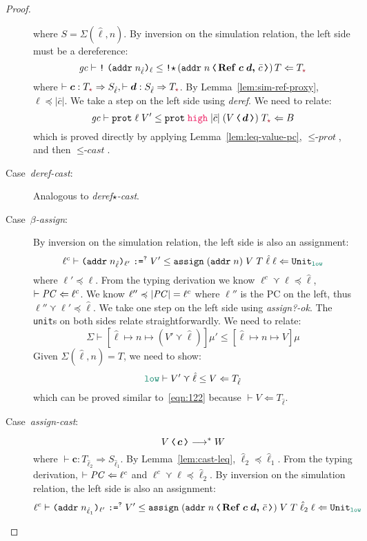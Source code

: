 \begin{proof}
\begin{description}
  where $S = \Sigma(\hat{\ell}, n)$.
  By inversion on the simulation relation, the left side must be a dereference:
  \[
  \simrel{\gc}{\dynderef{\dynaddr{n_{\hat{\ell}}}{\ell}}}{\ccderefstar{(\cccast{\ccaddr{n}}{\coerc{\refco{\bm{c}}{\bm{d}}}{\bar{c}}})}{T}}{T_{\unk}}
  \]
  where $\vdash \bm{c} : T_{\unk} \Rightarrow S_{\hat{\ell}} , \vdash \bm{d} : S_{\hat{\ell}} \Rightarrow T_{\unk}$.
  By Lemma~\ref{lem:sim-ref-proxy}, $\ell \preccurlyeq |\bar{c}|$.
  We take a step on the left side using \textit{deref}. We need to relate:
  \[
  \simrel{\gc}{\dynprot{\ell}{V'}}{\ccprot{\high}{|\bar{c}|}{(\cccast{V}{\bm{d}})}{T_{\unk}}}{B}
  \]
  which is proved directly by applying Lemma~\ref{lem:leq-value-pc}, ${\leq}\textit{-prot}$,
  and then ${\leq}\textit{-cast}$.
  \item[Case~\textit{deref-cast}:] Analogous to \textit{deref$\star$-cast}.
  \item[Case~\textit{$\beta$-assign}:]
  By inversion on the simulation relation, the left side is also an assignment:
  \[
  \simrel{\ell^c}{\dynassign{\dynaddr{n_{\hat{\ell}}}{\ell'}}{?}{V'}}{\ccassign{(\ccaddr{n})}{V}{T}{\hat{\ell}}{\ell}}{\Unit_{\low}}
  \]
  where $\ell' \preccurlyeq \ell$. From the typing derivation we know $\ell^c \curlyvee \ell \preccurlyeq \hat{\ell}$,
  $\vdash \mathit{PC} \Leftarrow \ell^c$. We know $\ell'' \preccurlyeq |\mathit{PC}| = \ell^c$ where $\ell''$ is the PC on the left,
  thus $\ell'' \curlyvee \ell' \preccurlyeq \hat{\ell}$. We take one step on the left side using \textit{assign?-ok}.
  The \texttt{unit}s on both sides relate straightforwardly. We need to relate:
  \[
  \Sigma \vdash [\hat{\ell} \mapsto n \mapsto (V' \curlyvee \hat{\ell})] \mu' \leq [\hat{\ell} \mapsto n \mapsto V] \mu
  \]
  Given $\Sigma(\hat{\ell}, n) = T$, we need to show:
  \[
  \simrel{\low}{V' \curlyvee \hat{\ell}}{V}{T_{\hat{\ell}}}
  \]
  which can be proved similar to~\eqref{eqn:122} because $\vdash V \Leftarrow T_{\hat{\ell}}$.
  \item[Case~\textit{assign-cast}:]
  \[
  \cccast{V}{\bm{c}} \longrightarrow^{*} W
  \]
  where $\vdash \bm{c} : T_{\hat{\ell}_2} \Rightarrow S_{\hat{\ell}_1}$. By Lemma~\ref{lem:cast-leq},
  $\hat{\ell}_2 \preccurlyeq \hat{\ell}_1$. From the typing derivation, $\vdash \mathit{PC} \Leftarrow \ell^c$ and
  $\ell^c \curlyvee \ell \preccurlyeq \hat{\ell}_2$. By inversion on the simulation relation,
  the left side is also an assignment:
  \[
  \simrel{\ell^c}{\dynassign{\dynaddr{n_{\hat{\ell}_1}}{\ell'}}{?}{V'}}{\ccassign{(\cccast{\ccaddr{n}}{\coerc{\refco{\bm{c}}{\bm{d}}}{\bar{c}}})}{V}{T}{\hat{\ell}_2}{\ell}}{\Unit_{\low}}
\]
\end{description}
\end{proof}
